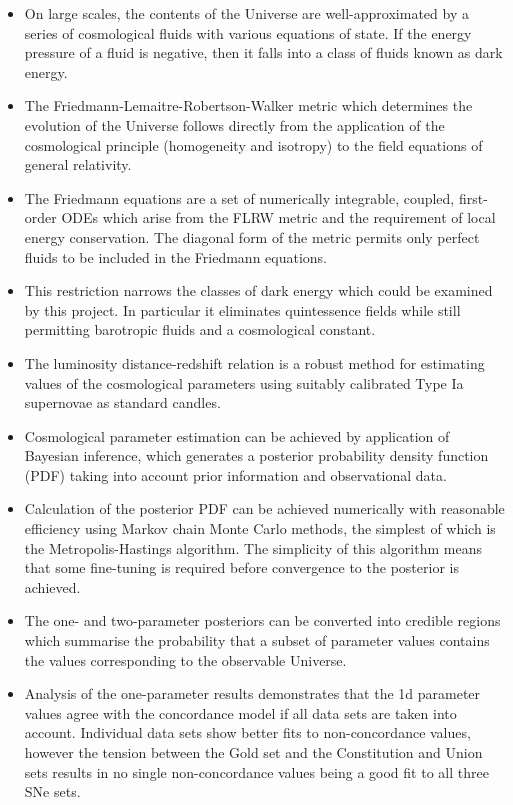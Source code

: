 \begin{itemize}
\item On large scales, the contents of the Universe are well-approximated by a series of cosmological fluids with various equations of state. If the energy pressure of a fluid is negative, then it falls into a class of fluids known as dark energy.
\item The Friedmann-Lemaitre-Robertson-Walker metric which determines the evolution of the Universe follows directly from the application of the cosmological principle (homogeneity and isotropy) to the field equations of general relativity.
 \item The Friedmann equations are a set of numerically integrable, coupled, first-order ODEs which arise from the FLRW metric and the requirement of local energy conservation. The diagonal form of the metric permits only perfect fluids to be included in the Friedmann equations.
\item This restriction narrows the classes of dark energy which could be examined by this project. In particular it eliminates quintessence fields while still permitting barotropic fluids and a cosmological constant.
\item The luminosity distance-redshift relation is a robust method for estimating values of the cosmological parameters using suitably calibrated Type Ia supernovae as standard candles.
\item Cosmological parameter estimation can be achieved by application of Bayesian inference, which generates a posterior probability density function (PDF) taking into account prior information and observational data.
\item Calculation of the posterior PDF can be achieved numerically with reasonable efficiency using Markov chain Monte Carlo methods, the simplest of which is the Metropolis-Hastings algorithm. The simplicity of this algorithm means that some fine-tuning is required before convergence to the posterior is achieved.
\item The one- and two-parameter posteriors can be converted into credible regions which summarise the probability that a subset of parameter values contains the values corresponding to the observable Universe.
\item Analysis of the one-parameter results demonstrates that the 1d parameter values agree with the concordance model if all data sets are taken into account. Individual data sets show better fits to non-concordance values, however the tension between the Gold set and the Constitution and Union sets results in no single non-concordance values being a good fit to all three SNe sets. 

\end{itemize}
